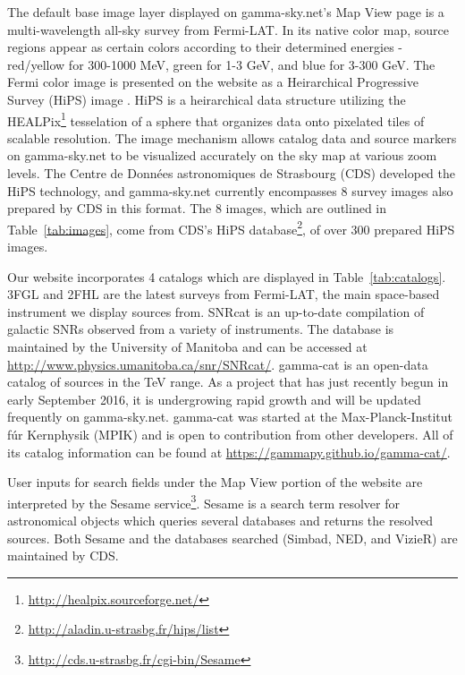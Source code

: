 





The default base image layer displayed on gamma-sky.net's Map View page is a multi-wavelength all-sky survey from Fermi-LAT. In its native color map, source regions appear as certain colors according to their determined energies - red/yellow for 300-1000 MeV, green for 1-3 GeV, and blue for 3-300 GeV. The Fermi color image is presented on the website as a Heirarchical Progressive Survey (HiPS) image \cite{hips}. HiPS is a heirarchical data structure utilizing the HEALPix\footnote[1]{\url{http://healpix.sourceforge.net/}} tesselation of a sphere that organizes data onto pixelated tiles of scalable resolution. The image mechanism allows catalog data and source markers on gamma-sky.net to be visualized accurately on the sky map at various zoom levels. The Centre de Donn\'{e}es astronomiques de Strasbourg (CDS) developed the HiPS technology, and gamma-sky.net currently encompasses 8 survey images also prepared by CDS in this format. The 8 images, which are outlined in Table~\ref{tab:images}, come from CDS's HiPS database\footnote[2]{\url{http://aladin.u-strasbg.fr/hips/list}}, of over 300 prepared HiPS images.

Our website incorporates 4 catalogs which are displayed in Table~\ref{tab:catalogs}. 3FGL \cite{3fgl} and 2FHL \cite{2fhl} are the latest surveys from Fermi-LAT, the main space-based instrument we display sources from. SNRcat \cite{snrcat} is an up-to-date compilation of galactic SNRs observed from a variety of instruments. The database is maintained by the University of Manitoba and can be accessed at \url{http://www.physics.umanitoba.ca/snr/SNRcat/}. gamma-cat is an open-data catalog of sources in the TeV range. As a project that has just recently begun in early September 2016, it is undergrowing rapid growth and will be updated frequently on gamma-sky.net. gamma-cat was started at the Max-Planck-Institut f\'{u}r Kernphysik (MPIK) and is open to contribution from other developers. All of its catalog information can be found at \url{https://gammapy.github.io/gamma-cat/}.

User inputs for search fields under the Map View portion of the website are interpreted by the Sesame service\footnote[3]{\url{http://cds.u-strasbg.fr/cgi-bin/Sesame}}. Sesame is a search term resolver for astronomical objects which queries several databases and returns the resolved sources. Both Sesame and the databases searched (Simbad, NED, and VizieR) are maintained by CDS.

